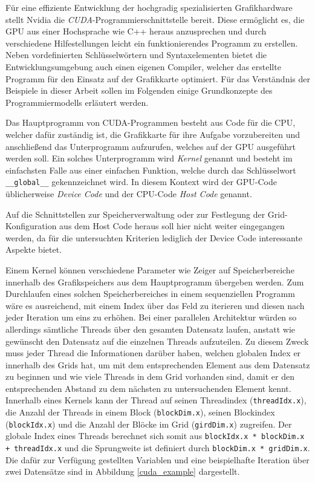 Für eine effiziente Entwicklung der hochgradig spezialisierten Grafikhardware stellt \mbox{Nvidia} die \emph{CUDA}-Programmierschnittstelle bereit.
Diese ermöglicht es, die GPU aus einer Hochsprache wie C++ heraus anzusprechen und durch verschiedene Hilfestellungen leicht ein funktionierendes Programm zu erstellen.
Neben vordefinierten Schlüsselwörtern und Syntaxelementen bietet die Entwicklungsumgebung auch einen eigenen Compiler, welcher das erstellte Programm für den Einsatz auf der Grafikkarte optimiert.
Für das Verständnis der Beispiele in dieser Arbeit sollen im Folgenden einige Grundkonzepte des Programmiermodells erläutert werden.

Das Hauptprogramm von CUDA-Programmen besteht aus Code für die CPU, welcher dafür zuständig ist, die Grafikkarte für ihre Aufgabe vorzubereiten und anschließend das Unterprogramm aufzurufen, welches auf der GPU ausgeführt werden soll.
Ein solches Unterprogramm wird \emph{Kernel} genannt und besteht im einfachsten Falle aus einer einfachen Funktion, welche durch das Schlüsselwort \texttt{\_\_global\_\_} gekennzeichnet wird.
In diesem Kontext wird der GPU-Code üblicherweise \emph{Device Code} und der CPU-Code \emph{Host Code} genannt.

Auf die Schnittstellen zur Speicherverwaltung oder zur Festlegung der Grid-Kon\-fi\-gu\-ra\-tion aus dem Host Code heraus soll hier nicht weiter eingegangen werden, da für die untersuchten Kriterien lediglich der Device Code interessante Aspekte bietet.

Einem Kernel können verschiedene Parameter wie Zeiger auf Speicherbereiche innerhalb des Grafikspeichers aus dem Hauptprogramm übergeben werden.
Zum Durchlaufen eines solchen Speicherbereiches in einem sequenziellen Programm wäre es ausreichend, mit einem Index über das Feld zu iterieren und diesen nach jeder Iteration um eins zu erhöhen.
Bei einer parallelen Architektur würden so allerdings sämtliche Threads über den gesamten Datensatz laufen, anstatt wie gewünscht den Datensatz auf die einzelnen Threads aufzuteilen.
Zu diesem Zweck muss jeder Thread die Informationen darüber haben, welchen globalen Index er innerhalb des Grids hat, um mit dem entsprechenden Element aus dem Datensatz zu beginnen und wie viele Threads in dem Grid vorhanden sind, damit er den entsprechenden Abstand zu dem nächsten zu untersuchenden Element kennt.
Innerhalb eines Kernels kann der Thread auf seinen Threadindex (\texttt{threadIdx.x}), die Anzahl der Threads in einem Block (\texttt{blockDim.x}), seinen Blockindex (\texttt{blockIdx.x}) und die Anzahl der Blöcke im Grid (\texttt{girdDim.x}) zugreifen.
Der globale Index eines Threads berechnet sich somit aus \texttt{blockIdx.x * blockDim.x + threadIdx.x} und die Sprungweite ist definiert durch \texttt{blockDim.x * gridDim.x}.
Die dafür zur Verfügung gestellten Variablen und eine beispielhafte Iteration über zwei Datensätze sind in Abbildung \ref{cuda_example} dargestellt.

